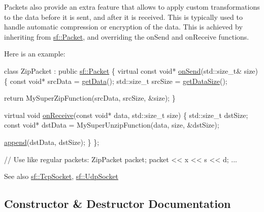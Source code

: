 Packets also provide an extra feature that allows to apply custom transformations to the data before it is sent, and after it is received. This is typically used to handle automatic compression or encryption of the data. This is achieved by inheriting from \hyperlink{classsf_1_1_packet}{sf\+::\+Packet}, and overriding the on\+Send and on\+Receive functions.

Here is an example\+: 
\begin{DoxyCode}
\textcolor{keyword}{class }ZipPacket : \textcolor{keyword}{public} \hyperlink{classsf_1_1_packet}{sf::Packet}
\{
    \textcolor{keyword}{virtual} \textcolor{keyword}{const} \textcolor{keywordtype}{void}* \hyperlink{classsf_1_1_packet_a052e955906c9bfd671622cb625380edc}{onSend}(std::size\_t& size)
    \{
        \textcolor{keyword}{const} \textcolor{keywordtype}{void}* srcData = \hyperlink{classsf_1_1_packet_abfd771803c822f89f187e1fcc2af5afc}{getData}();
        std::size\_t srcSize = \hyperlink{classsf_1_1_packet_a0fae6eccf2ca704fc5099cd90a9f56f7}{getDataSize}();

        \textcolor{keywordflow}{return} MySuperZipFunction(srcData, srcSize, &size);
    \}

    \textcolor{keyword}{virtual} \textcolor{keywordtype}{void} \hyperlink{classsf_1_1_packet_ab71a31ef0f1d5d856de6f9fc75434128}{onReceive}(\textcolor{keyword}{const} \textcolor{keywordtype}{void}* data, std::size\_t size)
    \{
        std::size\_t dstSize;
        \textcolor{keyword}{const} \textcolor{keywordtype}{void}* dstData = MySuperUnzipFunction(data, size, &dstSize);

        \hyperlink{classsf_1_1_packet_a7dd6e429b87520008326c4d71f1cf011}{append}(dstData, dstSize);
    \}
\};

\textcolor{comment}{// Use like regular packets:}
ZipPacket packet;
packet << x << s << d;
...
\end{DoxyCode}


\begin{DoxySeeAlso}{See also}
\hyperlink{classsf_1_1_tcp_socket}{sf\+::\+Tcp\+Socket}, \hyperlink{classsf_1_1_udp_socket}{sf\+::\+Udp\+Socket} 
\end{DoxySeeAlso}


\subsection{Constructor \& Destructor Documentation}
\mbox{\label{classsf_1_1_packet_a786e5d4ced83992ceefa1799963ea858}} 
